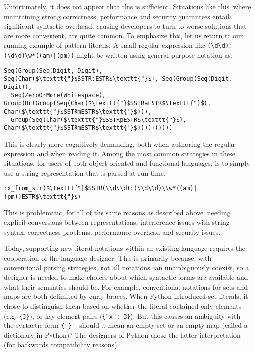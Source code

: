 Unfortunately, it does not appear that this is sufficient. Situations like this, where maintaining strong correctness, performance and security guarantees entails significant syntactic overhead, causing developers to turn to worse solutions that are more convenient, are quite common. To emphasize this, let us return to our running example of pattern literals. A small regular expression like \verb!(\d\d):(\d\d)\w*((am)|(pm))! might be written using general-purpose notation as:
\begin{lstlisting}
Seq(Group(Seq(Digit, Digit), Seq(Char($\texttt{"}$SSTR:ESTR$\texttt{"}$), Seq(Group(Seq(Digit, Digit)), 
  Seq(ZeroOrMore(Whitespace), Group(Or(Group(Seq(Char($\texttt{"}$SSTRaESTR$\texttt{"}$), Char($\texttt{"}$SSTRmESTR$\texttt{"}$))), 
  Group(Seq(Char($\texttt{"}$SSTRpESTR$\texttt{"}$), Char($\texttt{"}$SSTRmESTR$\texttt{"}$))))))))))
\end{lstlisting}
This is clearly more cognitively demanding, both when authoring the regular expression and when reading it. Among the most common strategies in these situations, for users of both object-oriented and functional languages, is to simply use a string representation that is parsed at run-time.
\begin{lstlisting}
rx_from_str($\texttt{"}$SSTR(\\d\\d):(\\d\\d)\\w*((am)|(pm))ESTR$\texttt{"}$)
\end{lstlisting}
This is problematic, for all of the same reasons as described above: needing explicit conversions between representations, interference issues with string syntax, correctness problems, performance overhead and security issues.

Today, supporting new literal notations within an existing language requires the cooperation of the language designer. This is primarily because, with conventional parsing strategies, not all notations can unambiguously coexist, so a designer is needed to make choices about which syntactic forms are available and what their semantics should be. For example, conventional notations for sets and maps are both delimited by curly braces. When Python introduced set literals, it chose to distinguish them based on whether the literal contained only elements (e.g. \verb|{3}|), or key-element pairs (\verb|{"x": 3}|). But this causes an ambiguity with the syntactic form \verb|{ }| -- should it mean an empty set or an empty map (called a dictionary in Python)? The designers of Python chose the latter interpretation (for backwards compatibility reasons).

